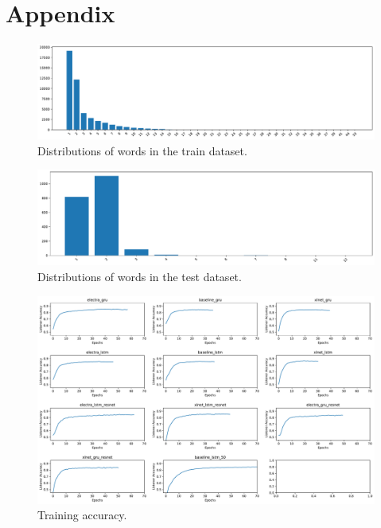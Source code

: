 \section{Appendix}
\label{sec:appendix}

\begin{figure}[htb!]
  \centering
  \includegraphics[width=\textwidth]{assets/trainset_words.pdf}
  \caption[Train dataset words]{Distributions of words in the train dataset.}
  \label{figure:trainset-words}
\end{figure}

\begin{figure}[htb!]
  \centering
  \includegraphics[width=\textwidth]{assets/testset_words.pdf}
  \caption[Test dataset words]{Distributions of words in the test dataset.}
  \label{figure:testset-words}
\end{figure}

\begin{figure}[htb!]
  \centering
  \includegraphics[width=\textwidth]{assets/training_accuracy.pdf}
  \caption[Training Accuracy]{Training accuracy.}
  \label{figure:training-accuracy}
\end{figure}

